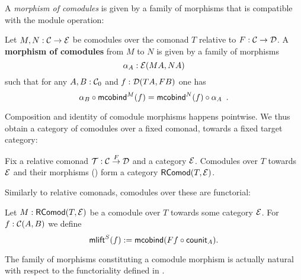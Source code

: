 \documentclass{amsart}
\newcommand{\fat}[1]{\textbf{#1}}
\begin{document}
A \emph{morphism of comodules} is given by a family of morphisms that is compatible with 
the module operation:

\begin{definition}\label{def:morphism_of_comodules}
 Let $M, N : \C \to \E$ be comodules over the comonad $T$ relative to  $F:\C \to \D$.
 A \fat{morphism of comodules} from $M$ to $N$ is given by a family of morphisms 
   \[ \alpha_A:\E(MA,NA) \]
 such that for any $A,B:\C_0$ and $f : \D(TA,FB)$ one has
 \[   \comp{\mcobind^M(f)}{\alpha_B} = \comp{\alpha_A}{\mcobind^N(f)} \enspace . \]
\end{definition}


Composition and identity of comodule morphisms happens pointwise. We thus obtain a category of comodules
over a fixed comonad, towards a fixed target category:

\begin{remark}
 Fix a relative comonad $\T : \C\stackrel{F}{\to}\D$ and a category $\E$.
 Comodules over $T$ towards $\E$ and their morphisms () form a category $\RComod(T,\E)$.
\end{remark}

Similarly to relative comonads, comodules over these are functorial:

\begin{definition}\label{def:comodule_lift}
 Let $M : \RComod(T,\E)$ be a comodule over $T$ towards some category $\E$. For $f : \C(A,B)$ we define
  \[ \mlift^S(f) := \mcobind(\comp{\counit_A}{Ff}) .  \]
\end{definition}


\begin{remark}
  The family of morphisms constituting a comodule morphism is actually natural with respect to the functoriality 
  defined in .
\end{remark}
\end{document}
